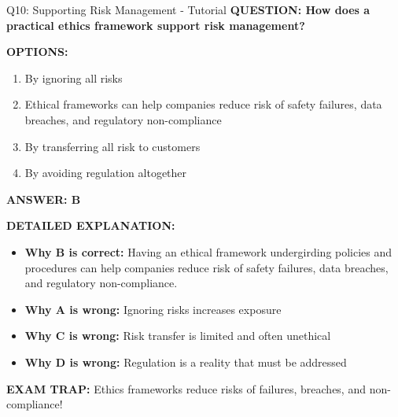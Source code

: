 \documentclass[8pt]{beamer}
\begin{document}
	\begin{frame}{Q10: Supporting Risk Management - Tutorial}
		\fontsize{6.5}{7.5}\selectfont
		\textbf{QUESTION: How does a practical ethics framework support risk management?}
		
		\vspace{0.1cm}
		\textbf{OPTIONS:}
		\begin{enumerate}
			\item By ignoring all risks
			\item Ethical frameworks can help companies reduce risk of safety failures, data breaches, and regulatory non-compliance
			\item By transferring all risk to customers
			\item By avoiding regulation altogether
		\end{enumerate}
		
		\vspace{0.1cm}
		\textcolor{myblue}{\textbf{ANSWER: B}}
		
		\vspace{0.1cm}
		\textbf{DETAILED EXPLANATION:}
		\begin{itemize}
			\item \textbf{Why B is correct:} Having an ethical framework undergirding policies and procedures can help companies reduce risk of safety failures, data breaches, and regulatory non-compliance.
			\item \textbf{Why A is wrong:} Ignoring risks increases exposure
			\item \textbf{Why C is wrong:} Risk transfer is limited and often unethical
			\item \textbf{Why D is wrong:} Regulation is a reality that must be addressed
		\end{itemize}
		
		\textcolor{myred}{\textbf{EXAM TRAP:}} Ethics frameworks \textcolor{myblue}{reduce risks} of failures, breaches, and non-compliance!
	\end{frame}
	
\end{document}
